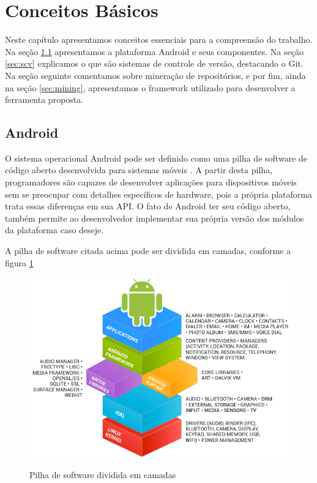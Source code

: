 \documentclass[a4paper,12pt]{article}
\numberwithin{figure}{section}
\begin{document}

\newpage

\section{Conceitos Básicos}

Neste capítulo apresentamos conceitos essenciais para a compreensão do trabalho. Na seção \ref{sec:android} apresentamos a plataforma Android e seus componentes. Na seção \ref{sec:scv} explicamos o que são sistemas de controle de versão, destacando o Git.  Na seção seguinte comentamos sobre mineração de repositórios, e por fim, ainda na seção \ref{sec:mining}, apresentamos o framework utilizado para desenvolver a ferramenta proposta.

\subsection{Android}%
\label{sec:android}
O sistema operacional Android pode ser definido como uma pilha de software de código aberto desenvolvida para sistemas móveis \cite{androidSource}. A partir desta pilha, programadores são capazes de desenvolver aplicações para dispositivos móveis sem se preocupar com detalhes específicos de hardware, pois a própria plataforma trata essas diferenças em sua API. O fato de Android ter seu código aberto, também permite ao desenvolvedor implementar sua própria versão dos módulos da plataforma caso deseje.

A pilha de software citada acima pode ser dividida em camadas, conforme a figura \ref{fig:androidStack}

\begin{figure}[h]
\centering
\includegraphics[width=0.8\linewidth]{imgs/android_framework_details.png}
\label{fig:androidStack}
\caption{Pilha de software dividida em camadas \cite{androidSource}}
\end{figure}
\end{document}

